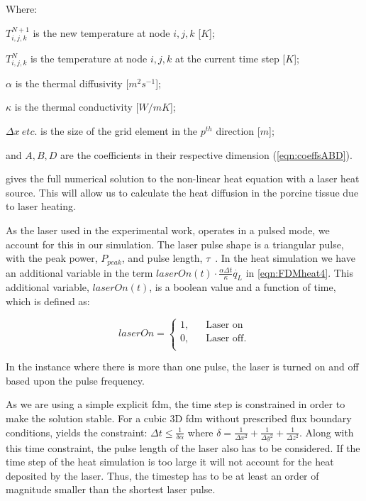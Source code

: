 \noindent Where:

	\indent $T^{N+1}_{i,j,k}$ is the new temperature at node $i,j,k$ [$K$];
	
	\indent $T^N_{i,j,k}$ is the temperature at node $i,j,k$ at the current time step [$K$];
	
	\indent $\alpha$ is the thermal diffusivity [$m^2 s^{-1}$];
	
	\indent $\kappa$ is the thermal conductivity [$W/m K$];
	
	\indent $\Delta x\ etc.$ is the size of the grid element in the $p^{th}$ direction [$m$];
	
	\indent and $A, B,D$ are the coefficients in their respective dimension (\cref{eqn:coeffsABD}).

	\medskip
	
 gives the full numerical solution to the non-linear heat equation with a laser heat source. This will allow us to calculate the heat diffusion in the porcine tissue due to laser heating.

\medskip

As the laser used in the experimental work, operates in a pulsed mode, we account for this in our simulation. The laser pulse shape is a triangular pulse, with the peak power, $P_{peak}$, and pulse length, $\tau$~\cite{pixelco2manual}. In the heat simulation we have an additional variable in the term $laserOn(t)\cdot\tfrac{\alpha \Delta t}{\kappa}\dot{q_L}$ in \cref{eqn:FDMheat4}. This additional variable, $laserOn(t)$, is a boolean value and a function of time, which is defined as:

\[   
laserOn = 
     \begin{cases}
       \text{1,} &\quad\text{Laser on}\\
       \text{0,} &\quad\text{Laser off}.\\
     \end{cases}
\]

In the instance where there is more than one pulse, the laser is turned on and off based upon the pulse frequency.

\medskip

As we are using a simple explicit \gls{fdm}, the time step is constrained in order to make the solution stable. For a cubic 3D \gls{fdm} without prescribed flux boundary conditions, yields the constraint: $\Delta t \leq \tfrac{1}{\delta \alpha}$ where $\delta=\tfrac{1}{\Delta x^2}+\tfrac{1}{\Delta y^2}+\tfrac{1}{\Delta z^2}$. Along with this time constraint, the pulse length of the laser also has to be considered. If the time step of the heat simulation is too large it will not account for the heat deposited by the laser. Thus, the timestep has to be at least an order of magnitude smaller than the shortest laser pulse.

